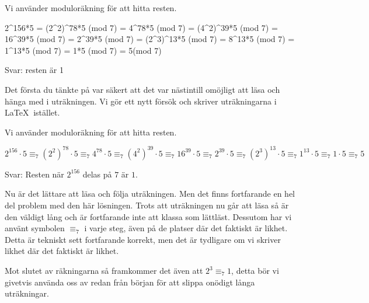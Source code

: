 \documentclass[titlepage]{article}
\begin{document}
\begin{center}
\begin{tcolorbox}[width=\linewidth,colback={red!15!white},title={\textbf{Lösning 1 - Sämre}},outer arc=0mm,colupper=black]
    Vi använder moduloräkning för att hitta resten.

    2\textasciicircum{156}*5 = (2\textasciicircum2)\textasciicircum 78*5 (mod 7) = 4\textasciicircum78*5 (mod 7) = (4\textasciicircum2)\textasciicircum39*5 (mod 7) = 16\textasciicircum39*5 (mod 7) = 2\textasciicircum39*5 (mod 7) = (2\textasciicircum3)\textasciicircum13*5 (mod 7) = 8\textasciicircum13*5 (mod 7) = 1\textasciicircum13*5 (mod 7) = 1*5 (mod 7) = 5(mod 7)

    Svar: resten är 1
\end{tcolorbox} 
\end{center}

Det första du tänkte på var säkert att det var nästintill omöjligt att läsa och hänga med i uträkningen. Vi gör ett nytt försök och skriver uträkningarna i \LaTeX$\:$ istället.

\begin{center}
\begin{tcolorbox}[width=\linewidth,colback={red!15!white},title={\textbf{Lösning 2 - Något bättre}},outer arc=0mm,colupper=black]
    Vi använder moduloräkning för att hitta resten.

    $2^{156}\cdot 5 \equiv_7 (2^2)^{78}\cdot 5\equiv_7 4^{78} \cdot 5 \equiv_7 (4^2)^{39} \cdot 5 \equiv_7 16^{39} \cdot 5 \equiv_7 2^{39} \cdot 5 \equiv_7 (2^3)^{13} \cdot 5 \equiv_7 1^{13}\cdot 5 \equiv_7 1 \cdot 5 \equiv_7 5$

    Svar: Resten när $2^{156}$ delas på $7$ är $1$.
\end{tcolorbox} 
\end{center}

Nu är det lättare att läsa och följa uträkningen. Men det finns fortfarande en hel del problem med den här lösningen. Trots att uträkningen nu går att läsa så är den väldigt lång och är fortfarande inte att klassa som lättläst. Dessutom har vi använt symbolen $\equiv_7$ i varje steg, även på de platser där det faktiskt är likhet. Detta är tekniskt sett fortfarande korrekt, men det är tydligare om vi skriver likhet där det faktiskt är likhet. 

Mot slutet av räkningarna så framkommer det även att $2^3 \equiv_7 1$, detta bör vi givetvis använda oss av redan från början för att slippa onödigt långa uträkningar.
\end{document}
